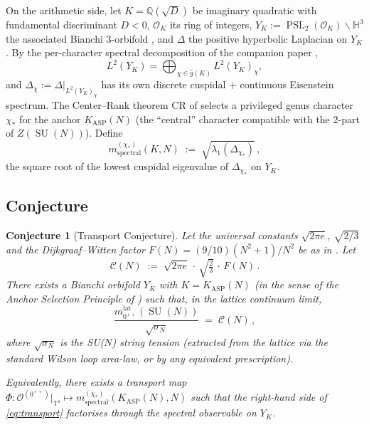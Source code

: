 \documentclass[11pt,a4paper,reqno]{amsart}
\newtheorem{conjecture}[theorem]{Conjecture}
\theoremstyle{definition}
\DeclareMathOperator{\PSL}{PSL}
\DeclareMathOperator{\SU}{SU}
\newcommand{\OK}{\mathcal{O}_K}
\newcommand{\YK}{Y_K}
\newcommand{\KASP}{K_{\mathrm{ASP}}}
\newcommand{\HH}{\mathbb{H}}
\newcommand{\QQ}{\mathbb{Q}}
\newcommand{\TT}{\mathbb{T}}
\begin{document}
On the arithmetic side, let $K=\QQ(\sqrt{D})$ be imaginary quadratic with fundamental discriminant $D<0$, $\OK$ its ring of integers, $\YK := \PSL_2(\OK)\backslash\HH^3$ the associated Bianchi 3-orbifold \cite[\S 1.5]{ElstrodtGrunewaldMennicke1998}, and $\Delta$ the positive hyperbolic Laplacian on $\YK$. By the per-character spectral decomposition of the companion paper \cite{Remondiere2026Selberg},
\[
   L^2(\YK) = \bigoplus_{\chi \in \widehat{g}(K)} L^2(\YK)_\chi,
\]
and $\Delta_\chi := \Delta\big|_{L^2(\YK)_\chi}$ has its own discrete cuspidal + continuous Eisenstein spectrum. The Center--Rank theorem CR of \cite{Remondiere2026CenterRank} selects a privileged genus character $\chi_*$ for the anchor $\KASP(N)$ (the ``central'' character compatible with the 2-part of $Z(\SU(N))$). Define
\begin{equation}\label{eq:mspectral}
   m^{(\chi_*)}_{\mathrm{spectral}}(K, N)
   \;:=\; \sqrt{\lambda_1(\Delta_{\chi_*})}\,,
\end{equation}
the square root of the lowest cuspidal eigenvalue of $\Delta_{\chi_*}$ on $\YK$.

\subsection{Conjecture}\label{ss:conj}

\begin{conjecture}[Transport Conjecture]\label{conj:transport-formal}
Let the universal constants $\sqrt{2\pi e}$, $\sqrt{2/3}$ and the Dijkgraaf--Witten factor $F(N) = (9/10)(N^2+1)/N^2$ be as in \cite{Remondiere2026RouteB}. Let
\[
   \mathcal{C}(N) \;:=\; \sqrt{2\pi e}\,\cdot\,\sqrt{\tfrac{2}{3}}\,\cdot\,F(N)\,.
\]
There exists a Bianchi orbifold $\YK$ with $K = \KASP(N)$ (in the sense of the Anchor Selection Principle of \cite{Remondiere2026CenterRank}) such that, in the lattice continuum limit,
\begin{equation}\label{eq:transport}
   \frac{m_{0^{++}}^{\mathrm{lat}}(\SU(N))}{\sqrt{\sigma_N}}
   \;=\; \mathcal{C}(N)\,,
\end{equation}
where $\sqrt{\sigma_N}$ is the SU($N$) string tension (extracted from the lattice via the standard Wilson loop area-law, or by any equivalent prescription).

Equivalently, there exists a \emph{transport map} $\Phi : \mathcal{O}^{(0^{++})}|_{\TT^4} \mapsto m^{(\chi_*)}_{\mathrm{spectral}}(\KASP(N), N)$ such that the right-hand side of \eqref{eq:transport} factorises through the spectral observable on $\YK$.
\end{conjecture}
\end{document}

